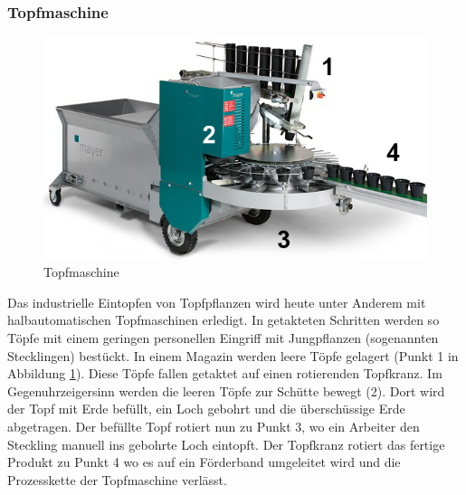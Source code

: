 \subsubsection{Topfmaschine}
\begin{figure}
	\includegraphics[scale=0.5]{Illustrationen/3-Einleitung/schema_topfmaschine.jpg}
	\caption{Topfmaschine}
	\label{fig:schema_topfmaschine}
\end{figure}
Das industrielle Eintopfen von Topfpflanzen wird heute unter Anderem mit halbautomatischen Topfmaschinen erledigt. In getakteten Schritten werden so Töpfe mit einem geringen personellen Eingriff mit Jungpflanzen (sogenannten Stecklingen) bestückt. In einem Magazin werden leere Töpfe gelagert (Punkt 1 in Abbildung \ref{fig:schema_topfmaschine}). Diese Töpfe fallen getaktet auf einen rotierenden Topfkranz. Im Gegenuhrzeigersinn werden die leeren Töpfe zur Schütte bewegt (2). Dort wird der Topf mit Erde befüllt, ein Loch gebohrt und die überschüssige Erde abgetragen. Der befüllte Topf rotiert nun zu Punkt 3, wo ein Arbeiter den Steckling manuell ins gebohrte Loch eintopft. Der Topfkranz rotiert das fertige Produkt zu Punkt 4 wo es auf ein Förderband umgeleitet wird und die Prozesskette der Topfmaschine verlässt.

